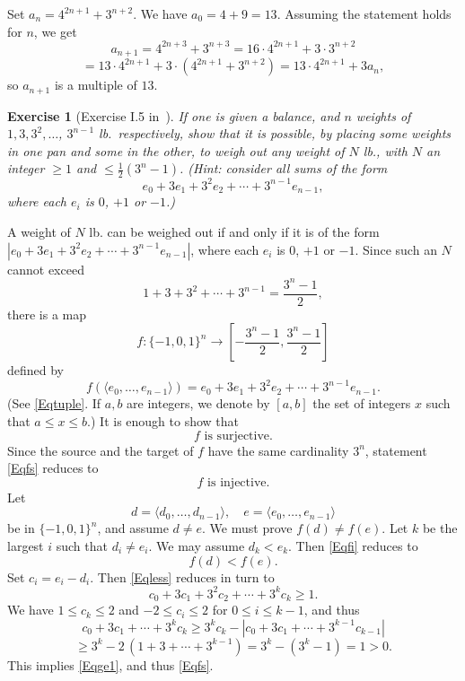 \documentclass[12pt,letterpaper]{article}
\newtheorem{exer}[thm]{Exercise}
\theoremstyle{definition}
\begin{document}
Set $a_n=4^{2n+1}+3^{n+2}$. We have $a_0=4+9=13$. Assuming the statement holds for $n$, we get 
$$
a_{n+1} = 4^{2n+3}+3^{n+3} = 16\cdot 4^{2n+1}+3\cdot 3^{n+2}
$$ 
$$
= 13\cdot 4^{2n+1} + 3\cdot (4^{2n+1} + 3^{n+2}) = 13\cdot 4^{2n+1} + 3 a_n,
$$ 
so $a_{n+1}$ is a multiple of $13$. 

\begin{exer}[Exercise I.5 in~\cite{weil1979}] 
If one is given a balance, and $n$ weights of $1,3,3^2,\ldots$, $3^{n-1}$ lb.\ respectively, show that it is possible, by placing some weights in one pan and some in the other, to weigh out any weight of $N$ lb., with $N$ an integer $\ge 1$ and $\le \frac{1}{2}(3^n-1)$. (Hint: consider all sums of the form
\[
e_0+3e_1+3^2e_2+\cdots+3^{n-1}e_{n-1},
\]
where each $e_i$ is $0$, $+1$ or $-1$.)
\end{exer}

A weight of $N$ lb. can be weighed out if and only if it is of the form $|e_0+3e_1+3^2e_2+\cdots+3^{n-1}e_{n-1}|$, where each $e_i$ is $0$, $+1$ or $-1$. Since such an $N$ cannot exceed 
$$
1+3+3^2+\cdots+3^{n-1}=\frac{3^n-1}{2},
$$ 
there is a map 
$$
f:\{-1,0,1\}^n\to\left[-\frac{3^n-1}{2},\frac{3^n-1}{2}\right]
$$ 
defined by 
$$
f(\langle e_0,\ldots,e_{n-1}\rangle)=e_0+3e_1+3^2e_2+\cdots+3^{n-1}e_{n-1}.
$$ 
(See \eqref{Eqtuple}. If $a,b$ are integers, we denote by $[a,b]$ the set of integers $x$ such that $a\le x\le b$.) It is enough to show that 
\begin{equation}\label{Eqfs}
f\text{ is surjective.}
\end{equation}
Since the source and the target of $f$ have the same cardinality $3^n$, statement \eqref{Eqfs} reduces to 
\begin{equation}\label{Eqfi}
f\text{ is injective.}
\end{equation}
Let 
$$
d=\langle d_0,\ldots,d_{n-1}\rangle,\quad e=\langle e_0,\ldots,e_{n-1}\rangle
$$ 
be in $\{-1,0,1\}^n$, and assume $d\ne e$. We must prove $f(d)\ne f(e)$. Let $k$ be the largest $i$ such that $d_i\ne e_i$. We may assume $d_k<e_k$. Then \eqref{Eqfi} reduces to 
\begin{equation}\label{Eqless}
f(d)<f(e).
\end{equation} 
Set $c_i=e_i-d_i$. Then \eqref{Eqless} reduces in turn to 
\begin{equation}\label{Eqge1} 
c_0+3c_1+3^2c_2+\cdots+3^kc_k\ge1.
\end{equation} 
We have $1\le c_k\le 2$ and $-2\le c_i\le2$ for $0\le i\le k-1$, and thus 
$$
c_0+3c_1+\cdots+3^kc_k \ge 3^kc_k - |c_0+3c_1+\cdots+3^{k-1}c_{k-1}|
$$ 
$$
\ge 3^k - 2\, (1+3+\cdots+3^{k-1}) = 3^k - (3^k-1) = 1 > 0.
$$ 
This implies \eqref{Eqge1}, and thus \eqref{Eqfs}. 
\end{document}
